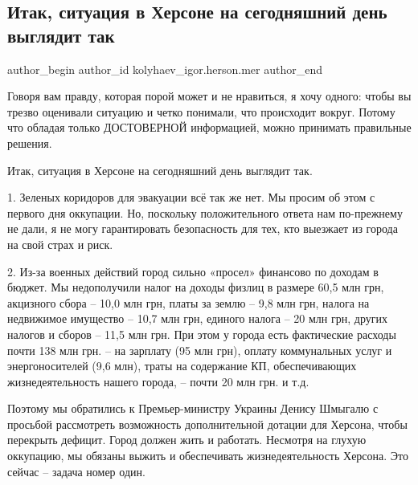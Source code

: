  
 
 
 
 
 
\subsection{Итак, ситуация в Херсоне на сегодняшний день выглядит так}
\label{sec:22_04_2022.fb.kolyhaev_igor.herson.mer.1.herson}
 
\ifcmt
 author_begin
   author_id kolyhaev_igor.herson.mer
 author_end
\fi

Говоря вам правду, которая порой может и не нравиться, я хочу одного: чтобы вы
трезво оценивали ситуацию и четко понимали, что происходит вокруг. Потому что
обладая только ДОСТОВЕРНОЙ информацией, можно принимать правильные решения. 


Итак, ситуация в Херсоне на сегодняшний день выглядит так.

1. Зеленых коридоров для эвакуации всё так же нет. Мы просим об этом с первого
дня оккупации. Но, поскольку положительного ответа нам по-прежнему не дали, я
не могу гарантировать безопасность для тех, кто выезжает из города на свой
страх и риск.

2. Из-за военных действий город сильно «просел» финансово по доходам в бюджет.
Мы недополучили налог на доходы физлиц в размере 60,5 млн грн, акцизного сбора
– 10,0 млн грн, платы за землю – 9,8 млн грн, налога на недвижимое имущество –
10,7 млн грн, единого налога – 20 млн грн, других налогов и сборов – 11,5 млн
грн. При этом у города есть фактические расходы почти 138 млн грн. – на
зарплату (95 млн грн), оплату коммунальных услуг и энергоносителей (9,6 млн),
траты на содержание КП, обеспечивающих жизнедеятельность нашего города, – почти
20 млн грн. и т.д.

Поэтому мы обратились к Премьер-министру Украины Денису Шмыгалю с просьбой
рассмотреть возможность дополнительной дотации для Херсона, чтобы перекрыть
дефицит. Город должен жить и работать. Несмотря на глухую оккупацию, мы обязаны
выжить и обеспечивать жизнедеятельность Херсона. Это сейчас – задача номер
один.

